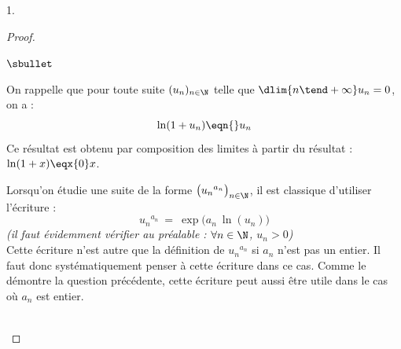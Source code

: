 \documentclass[11pt]{article}%
\begin{document}
\begin{noliste}{1.}
\begin{proof}
    \begin{remark}
      \begin{noliste}{$\sbullet$}
      \item On rappelle que pour toute suite $(u_n)_{n \in \N}$ telle
        que $\dlim{n \tend +\infty} u_n = 0$, on a : 
        \[
        \ln(1+u_n) \eqn{} u_n
        \]
        Ce résultat est obtenu par composition des limites à partir du
        résultat : $\ln(1+x) \eqx{0} x$.
      \item Lorsqu'on étudie une suite de la forme $\big( u_n{}^{a_n}
        \big)_{n \in \N}$, il est classique d'utiliser l'écriture :
        \[
        u_n{}^{a_n} \ = \ \exp\big( a_n \ \ln(u_n) \big)
        \]
        {\it (il faut évidemment vérifier au préalable : $\forall n
          \in \N$, $u_n > 0$)}\\[.1cm]
        Cette écriture n'est autre que la définition de $u_n{}^{a_n}$
        si $a_n$ n'est pas un entier. Il faut donc systématiquement
        penser à cette écriture dans ce cas. Comme le démontre la
        question précédente, cette écriture peut aussi être utile dans
        le cas où $a_n$ est entier.
      \end{noliste}
    \end{remark}~\\[-1.4cm]
  \end{proof}
\end{noliste}
\end{document}
